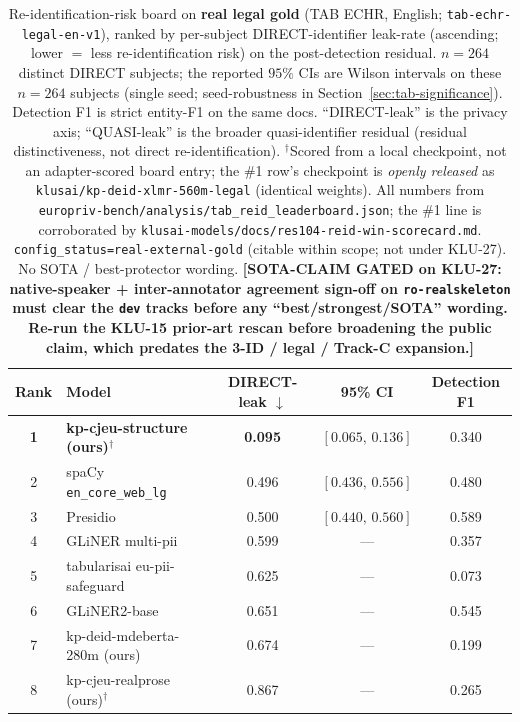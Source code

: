 \documentclass[11pt]{article}
\newcommand{\sotagate}{\textbf{[SOTA-CLAIM GATED on KLU-27: native-speaker + inter-annotator
agreement sign-off on \texttt{ro-realskeleton} must clear the \texttt{dev} tracks before any
``best/strongest/SOTA'' wording. Re-run the KLU-15 prior-art rescan before broadening the public
claim, which predates the 3-ID / legal / Track-C expansion.]}}
\begin{document}
\begin{table}[t]
\centering
\small
\caption{Re-identification-risk board on \textbf{real legal gold} (TAB ECHR, English;
\texttt{tab-echr-legal-en-v1}), ranked by per-subject DIRECT-identifier leak-rate (ascending; lower
$=$ less re-identification risk) on the post-detection residual. $n{=}264$ distinct DIRECT subjects;
the reported $95\%$ CIs are Wilson intervals on these $n{=}264$ subjects (single seed; seed-robustness
in Section~\ref{sec:tab-significance}).
Detection F1 is strict entity-F1 on the same docs. ``DIRECT-leak'' is the privacy axis;
``QUASI-leak'' is the broader quasi-identifier residual (residual distinctiveness, not direct
re-identification). $^{\dagger}$Scored from a local checkpoint, not
an adapter-scored board entry; the \#1 row's checkpoint is \emph{openly released} as
\texttt{klusai/kp-deid-xlmr-560m-legal} (identical weights). All numbers from
\texttt{europriv-bench/analysis/tab\_reid\_leaderboard.json}; the \#1 line is corroborated by
\texttt{klusai-models/docs/res104-reid-win-scorecard.md}. \texttt{config\_status=real-external-gold}
(citable within scope; not under KLU-27). No SOTA / best-protector wording. \sotagate{}}
\label{tab:tab-board}
\begin{tabular}{clccc}
\toprule
Rank & Model & DIRECT-leak $\downarrow$ & 95\% CI & Detection F1 \\
\midrule
\textbf{1} & \textbf{kp-cjeu-structure (ours)}$^{\dagger}$ & \textbf{0.095} & $[0.065,\,0.136]$ & 0.340 \\
2 & spaCy \texttt{en\_core\_web\_lg}        & 0.496 & $[0.436,\,0.556]$ & 0.480 \\
3 & Presidio                                & 0.500 & $[0.440,\,0.560]$ & 0.589 \\
4 & GLiNER multi-pii                        & 0.599 & --- & 0.357 \\
5 & tabularisai eu-pii-safeguard            & 0.625 & --- & 0.073 \\
6 & GLiNER2-base                            & 0.651 & --- & 0.545 \\
7 & kp-deid-mdeberta-280m (ours)            & 0.674 & --- & 0.199 \\
8 & kp-cjeu-realprose (ours)$^{\dagger}$    & 0.867 & --- & 0.265 \\
\bottomrule
\end{tabular}
\end{table}
\end{document}
